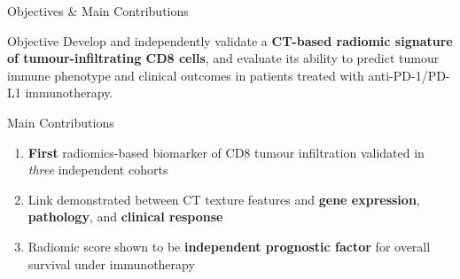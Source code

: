 \documentclass[aspectratio=1610]{beamer}
\begin{document}
\begin{frame}{Objectives \& Main Contributions}
    \begin{block}{Objective}
        Develop and independently validate a \textbf{CT-based radiomic signature of tumour-infiltrating CD8 cells}, and evaluate its ability to predict tumour immune phenotype and clinical outcomes in patients treated with anti-PD-1/PD-L1 immunotherapy.
    \end{block}

    \begin{block}{Main Contributions}
        \begin{enumerate}
            \item \textbf{First} radiomics-based biomarker of CD8 tumour infiltration validated in \textit{three} independent cohorts
            \item Link demonstrated between CT texture features and \textbf{gene expression}, \textbf{pathology}, and \textbf{clinical response}
            \item Radiomic score shown to be \textbf{independent prognostic factor} for overall survival under immunotherapy
        \end{enumerate}
    \end{block}
\end{frame}


\end{document}
